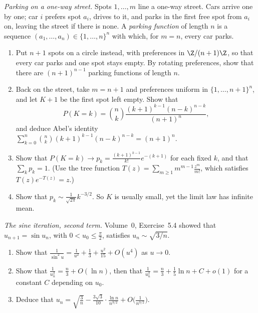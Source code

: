 \begin{exercise}[$\star\star$]\label{pb:parking}
\emph{Parking on a one-way street.} Spots $1,\dots,m$ line a one-way street. Cars arrive one by one; car $i$ prefers spot $a_i$, drives to it, and
parks in the first free spot from $a_i$ on, leaving the street if there is none. A \emph{parking function} of length $n$ is a sequence
$(a_1,\dots,a_n)\in\{1,\dots,n\}^n$ with which, for $m=n$, every car parks.
\begin{enumerate}[label=(\alph*)]
\item Put $n+1$ spots on a circle instead, with preferences in $\Z/(n+1)\Z$, so that every car parks and one spot stays empty. By rotating preferences,
show that there are $(n+1)^{n-1}$ parking functions of length $n$.
\item Back on the street, take $m=n+1$ and preferences uniform in $\{1,\dots,n+1\}^n$, and let $K+1$ be the first spot left empty. Show that
\[
P(K=k)=\binom nk\frac{(k+1)^{k-1}(n-k)^{n-k}}{(n+1)^n},
\]
and deduce Abel's identity $\sum_{k=0}^n\binom nk(k+1)^{k-1}(n-k)^{n-k}=(n+1)^n$.
\item Show that $P(K=k)\to p_k=\frac{(k+1)^{k-1}}{k!}e^{-(k+1)}$ for each fixed $k$, and that $\sum_kp_k=1$. (Use the tree function $T(z)=\sum_{m\ge1}m^{m-1}\frac{z^m}{m!}$,
which satisfies $T(z)e^{-T(z)}=z$.)
\item Show that $p_k\sim\frac1{\sqrt{2\pi}}k^{-3/2}$. So $K$ is usually small, yet the limit law has infinite mean.
\end{enumerate}
\end{exercise}

\begin{exercise}[$\star\star\star$]\label{pb:sinesecond}
\emph{The sine iteration, second term.} Volume~0, Exercise~5.4 showed that $u_{n+1}=\sin u_n$, with $0<u_0\le\frac\pi2$, satisfies $u_n\sim\sqrt{3/n}$.
\begin{enumerate}[label=(\alph*)]
\item Show that $\frac1{\sin^2u}=\frac1{u^2}+\frac13+\frac{u^2}{15}+O(u^4)$ as $u\to0$.
\item Show that $\frac1{u_n^2}=\frac n3+O(\ln n)$, then that $\frac1{u_n^2}=\frac n3+\frac15\ln n+C+o(1)$ for a constant $C$ depending on $u_0$.
\item Deduce that $u_n=\sqrt{\frac3n}-\frac{3\sqrt3}{10}\cdot\frac{\ln n}{n^{3/2}}+O\bigl(\frac1{n^{3/2}}\bigr)$.
\end{enumerate}
\end{exercise}

